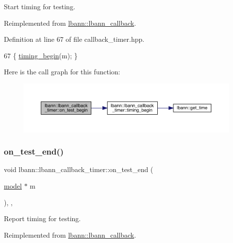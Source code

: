 Start timing for testing. 

Reimplemented from \hyperlink{classlbann_1_1lbann__callback_a716bff45bdc5a88eed09c2231f5bc93a}{lbann\+::lbann\+\_\+callback}.



Definition at line 67 of file callback\+\_\+timer.\+hpp.


\begin{DoxyCode}
67 \{ \hyperlink{classlbann_1_1lbann__callback__timer_a5eb2a9d5c0c2fe4a7d7f45369928e2fd}{timing\_begin}(m); \}
\end{DoxyCode}
Here is the call graph for this function\+:\nopagebreak
\begin{figure}[H]
\begin{center}
\leavevmode
\includegraphics[width=350pt]{classlbann_1_1lbann__callback__timer_a9fb5327fa629c23e51c9c3b065d6d8c5_cgraph}
\end{center}
\end{figure}
\mbox{\label{classlbann_1_1lbann__callback__timer_ab7db32c743128f8bcfc35c8ea56c226a}} 
\subsubsection{\texorpdfstring{on\+\_\+test\+\_\+end()}{on\_test\_end()}}
{\footnotesize\ttfamily void lbann\+::lbann\+\_\+callback\+\_\+timer\+::on\+\_\+test\+\_\+end (\begin{DoxyParamCaption}\item[{\hyperlink{classlbann_1_1model}{model} $\ast$}]{m }\end{DoxyParamCaption})\hspace{0.3cm}{\ttfamily [inline]}, {\ttfamily [override]}, {\ttfamily [virtual]}}

Report timing for testing. 

Reimplemented from \hyperlink{classlbann_1_1lbann__callback_accbad4dd004c1ced33642db6398b2efe}{lbann\+::lbann\+\_\+callback}.



